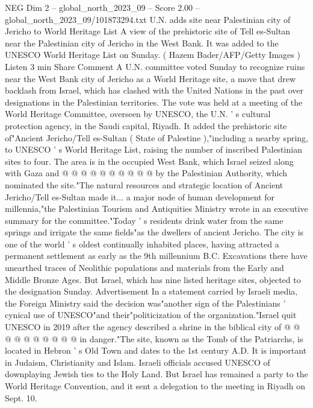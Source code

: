 \begin{textsample}{NEG Dim 2 – global\_north\_2023\_09 – Score 2.00 – global\_north\_2023\_09/101873294.txt}  \label{ex:f2_neg_306}
U.N. adds site near Palestinian city of Jericho to World Heritage List A view of the prehistoric site of Tell es-Sultan near the Palestinian city of Jericho in the West Bank.
It was added to the UNESCO World Heritage List on Sunday. ( Hazem Bader/AFP/Getty Images ) Listen 3 min Share Comment A U.N. committee voted Sunday to recognize ruins near the West Bank city of Jericho as a World Heritage site, a move that drew backlash from Israel, which has clashed with the United Nations in the past over designations in the Palestinian territories.
The vote was held at a meeting of the World Heritage Committee, overseen by UNESCO, the U.N. ' s cultural protection agency, in the Saudi capital, Riyadh.
It added the prehistoric site of"Ancient Jericho/Tell es-Sultan ( State of Palestine ),"including a nearby spring, to UNESCO ' s World Heritage List, raising the number of inscribed Palestinian sites to four.
The area is in the occupied West Bank, which Israel seized along with Gaza and @ @ @ @ @ @ @ @ @ @ by the Palestinian Authority, which nominated the site."The natural resources and strategic location of Ancient Jericho/Tell es-Sultan made it... a major node of human development for millennia,"the Palestinian Tourism and Antiquities Ministry wrote in an executive summary for the committee."Today ' s residents drink water from the same springs and irrigate the same fields"as the dwellers of ancient Jericho.
The city is one of the world ' s oldest continually inhabited places, having attracted a permanent settlement as early as the 9th millennium B.C.
Excavations there have unearthed traces of Neolithic populations and materials from the Early and Middle Bronze Ages.
But Israel, which has nine listed heritage sites, objected to the designation Sunday.
Advertisement In a statement carried by Israeli media, the Foreign Ministry said the decision was"another sign of the Palestinians ' cynical use of UNESCO"and their"politicization of the organization."Israel quit UNESCO in 2019 after the agency described a shrine in the biblical city of @ @ @ @ @ @ @ @ @ @ in danger."The site, known as the Tomb of the Patriarchs, is located in Hebron ' s Old Town and dates to the 1st century A.D.
It is important in Judaism, Christianity and Islam.
Israeli officials accused UNESCO of downplaying Jewish ties to the Holy Land.
But Israel has remained a party to the World Heritage Convention, and it sent a delegation to the meeting in Riyadh on Sept. 10.

\end{textsample}
